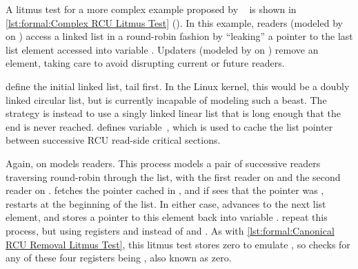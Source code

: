 \begin{fcvref}
A litmus test for a more complex example proposed by
~\cite{RomanPenyaev2018rrRCU} is shown in
\cref{lst:formal:Complex RCU Litmus Test}
().
In this example, readers (modeled by  on
) access a linked list
in a round-robin fashion by ``leaking'' a pointer to the last
list element accessed into variable .
Updaters (modeled by  on )
remove an element, taking care to avoid disrupting current or future
readers.

\QuickQuizEnd

 define the initial linked
list, tail first.
In the Linux kernel, this would be a doubly linked circular list,
but  is currently incapable of modeling such a beast.
The strategy is instead to use a singly linked linear list that
is long enough that the end is never reached.
 defines variable~, which is used to
cache the list pointer between successive RCU read-side critical
sections.

Again,  on  models readers.
This process models a pair of successive readers traversing round-robin
through the list, with the first reader on 
and the second reader on .
 fetches the pointer cached in , and if
 sees that the pointer was ,
 restarts at the beginning of the list.
In either case,  advances to the next list element,
and  stores a pointer to this element back into
variable .
 repeat this process, but using
registers  and  instead of  and .
As with
\cref{lst:formal:Canonical RCU Removal Litmus Test},
this litmus test stores zero to emulate , so
 checks for any of these four registers being
, also known as zero.


\end{fcvref}

